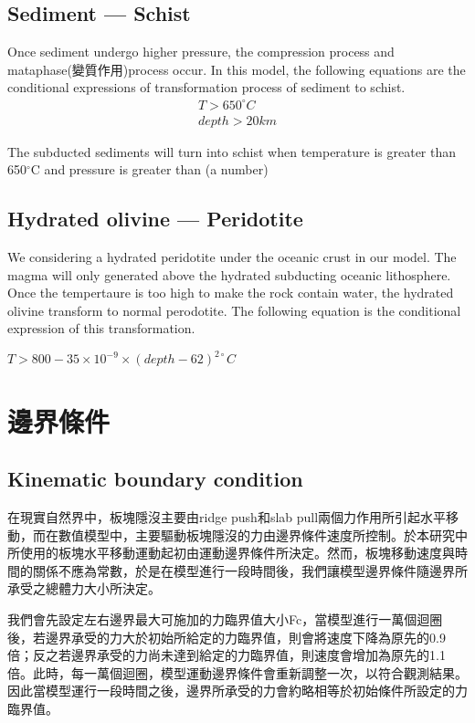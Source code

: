 \subsection{Sediment --- Schist}

Once sediment undergo higher pressure, the compression process and mataphase(變質作用)process occur.
In this model, the following equations are the conditional expressions of transformation process of sediment to schist.
\begin{align}
T > 650^{\circ} C\\
depth >  20 km 
\end{align}

The subducted sediments will turn into schist when temperature is greater than 650$^\circ$C and pressure is greater than (a number)

\subsection{Hydrated olivine --- Peridotite}

We considering a hydrated peridotite under the oceanic crust in our model. 
The magma will only generated above the hydrated subducting oceanic lithosphere.
Once the tempertaure is too high to make the rock contain water, the hydrated olivine transform to normal perodotite.
The following equation is the conditional expression of this transformation.

$T > 800-35\times 10^{-9}\times (depth-62)^{2\circ}C$

\section{邊界條件}

\subsection{Kinematic boundary condition}
在現實自然界中，板塊隱沒主要由ridge push和slab pull兩個力作用所引起水平移動，而在數值模型中，主要驅動板塊隱沒的力由邊界條件速度所控制。於本研究中所使用的板塊水平移動運動起初由運動邊界條件所決定。然而，板塊移動速度與時間的關係不應為常數，於是在模型進行一段時間後，我們讓模型邊界條件隨邊界所承受之總體力大小所決定。

我們會先設定左右邊界最大可施加的力臨界值大小Fc，當模型進行一萬個迴圈後，若邊界承受的力大於初始所給定的力臨界值，則會將速度下降為原先的0.9倍；反之若邊界承受的力尚未達到給定的力臨界值，則速度會增加為原先的1.1倍。此時，每一萬個迴圈，模型運動邊界條件會重新調整一次，以符合觀測結果。因此當模型運行一段時間之後，邊界所承受的力會約略相等於初始條件所設定的力臨界值。

